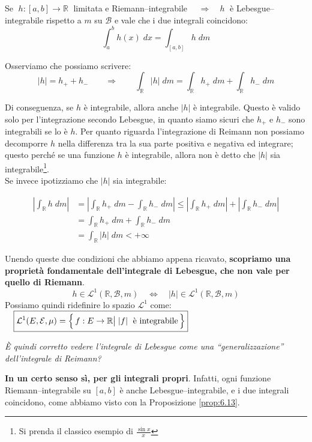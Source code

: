 \begin{proposizione}
\label{prop:6.13}
    Se $\;h:[a, b]\to \mathbb{R}\;$ limitata e Riemann--integrabile \(\quad \Rightarrow\quad h \; \) è Lebesgue--integrabile rispetto a $m$ su $\mathcal{B}$ e vale che i due integrali coincidono:
    \[\int_a^bh(x)\;dx = \int_{[a, b]} h \; dm\]
\end{proposizione}

\bigskip
\noindent Osserviamo che possiamo scrivere:
\[|h| = h_+ + h_-\qquad \Rightarrow \qquad \int_\mathbb{R}|h|\;dm =\int_\mathbb{R}h_+\;dm + \int_\mathbb{R}h_-\;dm \]

Di conseguenza, se $h$ è integrabile, allora anche $|h|$ è integrabile. Questo è valido solo per l'integrazione secondo Lebesgue, in quanto siamo sicuri che $h_+$ e $h_-$ sono integrabili se lo è $h$. Per quanto riguarda l'integrazione di Reimann non possiamo decomporre $h$ nella differenza tra la sua parte positiva e negativa ed integrare; questo perché se una funzione $h$ è integrabile, allora non è detto che $|h|$ sia integrabile\footnote{Si prenda il classico esempio di $\frac{\sin{x}}{x}$}.\\
Se invece ipotizziamo che $|h|$ sia integrabile:

\begin{align*}
    \left| \int_\mathbb{R} h\;dm\right| & = \left|\int_\mathbb{R}h_+\;dm - \int_\mathbb{R}h_-\;dm  \right| \leq \left|\int_\mathbb{R}h_+\;dm \right|+ \left|\int_\mathbb{R}h_-\;dm  \right| \\
    & = \int_\mathbb{R}h_+\;dm + \int_\mathbb{R}h_-\;dm\\
    & = \int_\mathbb{R} |h|\;dm < +\infty
\end{align*}

Unendo queste due condizioni che abbiamo appena ricavato, \textbf{scopriamo una proprietà fondamentale dell'integrale di Lebesgue, che non vale per quello di Riemann}.
\[\boxed{h\in\mathcal{L}^1(\mathbb{R}, \mathcal{B}, m) \quad \iff \quad |h| \in \mathcal{L}^1(\mathbb{R}, \mathcal{B}, m)}\]
Possiamo quindi ridefinire lo spazio $\mathcal{L}^1$ come: $\quad \boxed{\mathcal{L}^1(E, \mathcal{E}, \mu) = \Bigl\{\,f:E\to\mathbb{R}\big{|}\; |f|\; \text{ è integrabile}\,\Bigr\}}$

\newpage
\noindent \textit{È quindi corretto vedere l'integrale di Lebesgue come una ``generalizzazione'' dell'integrale di Reimann?}

\medskip
\noindent
\textbf{In un certo senso sì, per gli integrali propri}. Infatti, ogni funzione Riemann--integrabile su $[a,b]$ è anche Lebesgue--integrabile, e i due integrali coincidono, come abbiamo visto con la Proposizione \ref{prop:6.13}.

